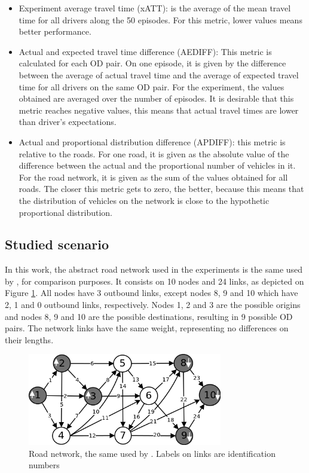 \documentclass[12pt]{article}
\begin{document}
\begin{itemize}
	\item Experiment average travel time (xATT): is the average of the mean travel time for all drivers along the 50 episodes. For this metric, lower values means better performance.
	\item Actual and expected travel time difference (AEDIFF): This metric is calculated for each OD pair. On one episode, it is given by the difference between the average of actual travel time and the average of expected travel time for all drivers on the same OD pair. For the experiment, the values obtained are averaged over the number of episodes. It is desirable that this metric reaches negative values, this means that actual travel times are lower than driver's expectations.
	\item Actual and proportional distribution difference (APDIFF): this metric is relative to the roads. For one road, it is given as the absolute value of the difference between the actual and the proportional number of vehicles in it. For the road network, it is given as the sum of the values obtained for all roads. The closer this metric gets to zero, the better, because this means that the distribution of vehicles on the network is close to the hypothetic proportional distribution.
\end{itemize}

\subsection{Studied scenario}

In this work, the abstract road network used in the experiments is the same used by \cite{Galib&Moser2011}, for comparison purposes. It consists on 10 nodes and 24 links, as depicted on Figure \ref{fig:roadnetwork}. All nodes have 3 outbound links, except nodes 8, 9 and 10 which have 2, 1 and 0 outbound links, respectively. Nodes 1, 2 and 3 are the possible origins and nodes 8, 9 and 10 are the possible destinations, resulting in 9 possible OD pairs. The network links have the same weight, representing no differences on their lengths.

\begin{figure}[ht]
    \centerline{\includegraphics[width=8.5cm]{img/roadnetwork.png}}
    \caption{Road network, the same used by \cite{Galib&Moser2011}. Labels on links are identification numbers}
    \label{fig:roadnetwork}
\end{figure}
\end{document}
